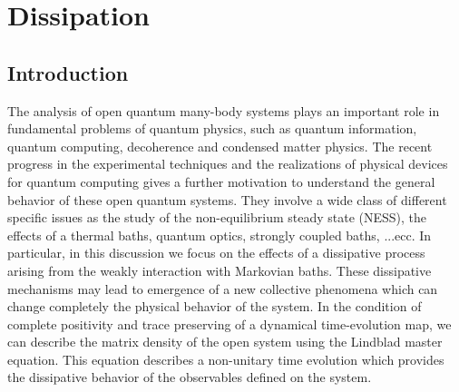 \chapter{Dissipation}
\label{chp_diss}


\section{Introduction}

The analysis of open quantum many-body systems plays an important role in fundamental problems of quantum physics, such as quantum information, quantum computing, decoherence and condensed matter physics. The recent progress in the experimental techniques and the realizations of physical devices for quantum computing gives a further motivation to understand the general behavior of these open quantum systems. They involve a wide class of different specific issues as the study of the non-equilibrium steady state (NESS), the effects of a thermal baths, quantum optics, strongly coupled baths, ...ecc. In particular, in this discussion we focus on the effects of a dissipative process arising from the weakly interaction with Markovian baths. These dissipative mechanisms may lead to emergence of a new collective phenomena which can change completely the physical behavior of the system. In the condition of complete positivity and trace preserving of a dynamical time-evolution map, we can describe the matrix density of the open system using the Lindblad master equation. This equation describes a non-unitary time evolution which provides the dissipative behavior of the observables defined on the system. 
